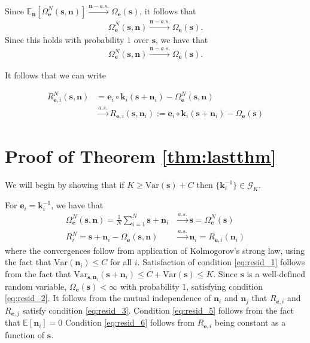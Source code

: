 Since $\mathbb{E}_{\bm{n}}[\Omega_{\bm{e}}^N(\bm{s}, \bm{n})] \overset{\bm{n}-a.s.}{\longrightarrow} \Omega_{\bm{e}}(\bm{s})$, it follows that
\begin{align*}
    \Omega_{\bm{e}}^N(\bm{s}, \bm{n}) \overset{\bm{n}-a.s.}{\longrightarrow} \Omega_{\bm{e}}(\bm{s}).
\end{align*}
Since this holds with probability $1$ over $\bm{s}$, we have that
\begin{align*}
    \Omega_{\bm{e}}^N(\bm{s}, \bm{n}) \overset{\bm{n}-a.s.}{\longrightarrow} \Omega_{\bm{e}}(\bm{s}).
\end{align*}

It follows that we can write

\begin{align*}
    R_{\bm{e}, i}^N(\bm{s}, \bm{n}) &= \bm{e}_i\circ \bm{k}_i( \bm{s} + \bm{n}_i) - \Omega_{\bm{e}}^N(\bm{s}, \bm{n}) \\
    &\overset{a.s.}{\longrightarrow} R_{\bm{e}, i}(\bm{s}, \bm{n}_i):= \bm{e}_i\circ \bm{k}_i( \bm{s} + \bm{n}_i) - \Omega_{\bm{e}}(\bm{s})
\end{align*}


\section{Proof of Theorem \ref{thm:lastthm}}
\label{sec:lasttmpr}

We will begin by showing that if $K \geq \mathrm{Var}(\bm{s}) + C$ then $\{ \bm{k}^{-1}_i \}  \in \mathcal{G}_K$.

For $\bm{e}_i = \bm{k}_i^{-1}$, we have that
\begin{align*}
    \Omega_{\bm{e}}^N(\bm{s}, \bm{n}) = \frac{1}{N} \sum_{i=1}^N \bm{s} + \bm{n}_i &\overset{a.s.}{\longrightarrow} \bm{s} = \Omega_{\bm{e}}^N(\bm{s})\\
    R_i^N = \bm{s} + \bm{n}_i - \Omega_{\bm{e}}(\bm{s}, \bm{n})  &\overset{a.s.}{\longrightarrow} \bm{n}_i = R_{\bm{e}, i}(\bm{n}_i)
\end{align*}
where the convergences follow from application of Kolmogorov's strong law, using the fact that $\mathrm{Var}(\bm{n}_i) \leq C$ for all $i$.
Satisfaction of condition \ref{eq:resid_1} follows from the fact that $\mathrm{Var}_{\bm{s}, \bm{n}_i} (\bm{s} + \bm{n}_i) \leq C + \mathrm{Var}(\bm{s}) \leq K$.
Since $\bm{s}$ is a well-defined random variable,  $\Omega_{\bm{e}}(\bm{s}) < \infty$ with probability $1$, satisfying condition \ref{eq:resid_2}.
It follows from the mutual independence of $\bm{n}_i$ and $\bm{n}_j$ that $R_{\bm{e}, i}$ and $R_{\bm{e}, j}$ satisfy condition \ref{eq:resid_3}.
Condition \ref{eq:resid_5} follows from the fact that $\mathbb{E}[\bm{n}_i]=0$
Condition \ref{eq:resid_6} follows from $R_{\bm{e}, i}$ being constant as a function of $\bm{s}$.

